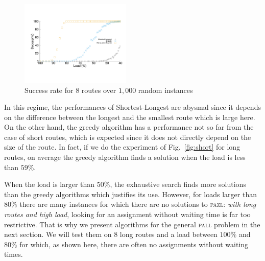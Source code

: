 \documentclass[10pt, conference, letterpaper]{IEEEtran}
\newcommand\pazl{\textsc{pazl}\xspace}
\newcommand\pall{\textsc{pall}\xspace}
\begin{document}
\begin{figure}[h]

       \begin{center}
      \includegraphics[width=0.47\textwidth]{echec_longues.pdf}
      \end{center}
          \vspace{-0.5cm}
      \caption{Success rate for $8$ routes over $1,000$ random instances}\label{fig:long}
     \end{figure}
      
      In this regime, the performances of Shortest-Longest are abysmal since it depends on the difference between the longest and the smallest route which is large here. On the other hand, the greedy algorithm has a performance not so far from the case of short routes, which is expected since it does not directly depend on the size of the route. In fact, if we do the experiment of Fig.~\ref{fig:short} for long routes, on average the greedy algorithm finds a solution when the load is less than $59\%$.
      
      When the load is larger than $50\%$, the exhaustive search finds more solutions than the greedy algorithms which justifies its use. However, for loads larger than $80\%$ there are many instances for which there are no solutions to \pazl: \emph{with long routes and high load}, looking for an assignment without waiting time is far too restrictive. That is why we present algorithms for the general \pall problem in the next section. We will test them on $8$ long routes and a load between $100\%$ and $80\%$ for which, as shown here, there are often no assignments without waiting times.
      
\end{document}
